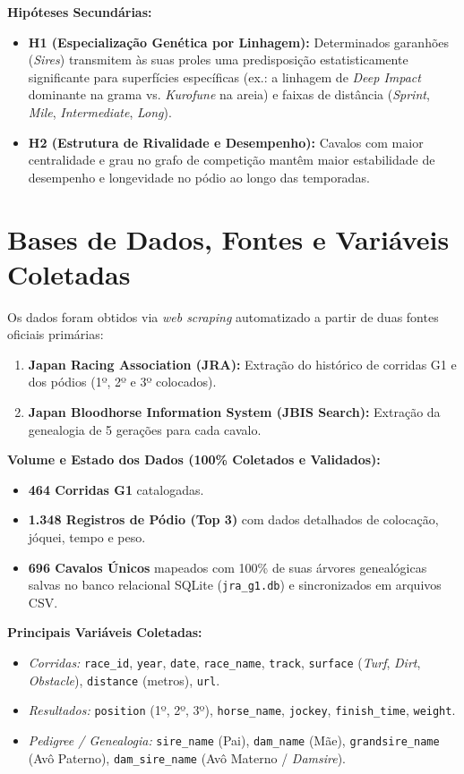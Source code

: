 \documentclass[11pt,a4paper]{article}
\begin{document}
\textbf{Hipóteses Secundárias:}
\begin{itemize}
    \item \textbf{H1 (Especialização Genética por Linhagem):} Determinados garanhões (\emph{Sires}) transmitem às suas proles uma predisposição estatisticamente significante para superfícies específicas (ex.: a linhagem de \emph{Deep Impact} dominante na grama vs. \emph{Kurofune} na areia) e faixas de distância (\emph{Sprint}, \emph{Mile}, \emph{Intermediate}, \emph{Long}).
    \item \textbf{H2 (Estrutura de Rivalidade e Desempenho):} Cavalos com maior centralidade e grau no grafo de competição mantêm maior estabilidade de desempenho e longevidade no pódio ao longo das temporadas.
\end{itemize}

\section{Bases de Dados, Fontes e Variáveis Coletadas}

Os dados foram obtidos via \emph{web scraping} automatizado a partir de duas fontes oficiais primárias:
\begin{enumerate}
    \item \textbf{Japan Racing Association (JRA):} Extração do histórico de corridas G1 e dos pódios (1º, 2º e 3º colocados).
    \item \textbf{Japan Bloodhorse Information System (JBIS Search):} Extração da genealogia de 5 gerações para cada cavalo.
\end{enumerate}

\textbf{Volume e Estado dos Dados (100\% Coletados e Validados):}
\begin{itemize}
    \item \textbf{464 Corridas G1} catalogadas.
    \item \textbf{1.348 Registros de Pódio (Top 3)} com dados detalhados de colocação, jóquei, tempo e peso.
    \item \textbf{696 Cavalos Únicos} mapeados com 100\% de suas árvores genealógicas salvas no banco relacional SQLite (\texttt{jra\_g1.db}) e sincronizados em arquivos CSV.
\end{itemize}

\textbf{Principais Variáveis Coletadas:}
\begin{itemize}
    \item \emph{Corridas:} \texttt{race\_id}, \texttt{year}, \texttt{date}, \texttt{race\_name}, \texttt{track}, \texttt{surface} (\emph{Turf}, \emph{Dirt}, \emph{Obstacle}), \texttt{distance} (metros), \texttt{url}.
    \item \emph{Resultados:} \texttt{position} (1º, 2º, 3º), \texttt{horse\_name}, \texttt{jockey}, \texttt{finish\_time}, \texttt{weight}.
    \item \emph{Pedigree / Genealogia:} \texttt{sire\_name} (Pai), \texttt{dam\_name} (Mãe), \texttt{grandsire\_name} (Avô Paterno), \texttt{dam\_sire\_name} (Avô Materno / \emph{Damsire}).
\end{itemize}
\end{document}
